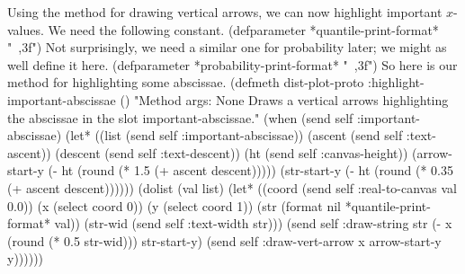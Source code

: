 Using the method for drawing vertical arrows, we can now highlight
important $x$-values. We need the following constant.
\nwenddocs{}\plusendmoddef
(defparameter *quantile-print-format* "~,3f")
\eatline
{}\nwendcode{}\nwdocspar
Not surprisingly, we need a similar one for probability later; we
might as well define it here.
\nwenddocs{}\plusendmoddef
(defparameter *probability-print-format* "~,3f")
\eatline
{}\nwendcode{}\nwdocspar
So here is our method for highlighting some abscissae.
\nwenddocs{}\plusendmoddef
(defmeth dist-plot-proto :highlight-important-abscissae ()
  "Method args: None
Draws a vertical arrows highlighting the abscissae in the slot
important-abscissae." 
  (when (send self :important-abscissae)
        (let* ((list (send self :important-abscissae))
               (ascent (send self :text-ascent))
               (descent (send self :text-descent))
               (ht (send self :canvas-height))
               (arrow-start-y (- ht (round (* 1.5 (+ ascent descent)))))
               (str-start-y (- ht (round (* 0.35 (+ ascent descent))))))
           (dolist (val list)
             (let* ((coord (send self :real-to-canvas val 0.0))
                    (x (select coord 0))
                    (y (select coord 1))
                    (str (format nil *quantile-print-format* val))
                    (str-wid (send self :text-width str)))
               (send self :draw-string str 
                 (- x (round (* 0.5 str-wid))) str-start-y)
               (send self :draw-vert-arrow x arrow-start-y y))))))
\eatline
